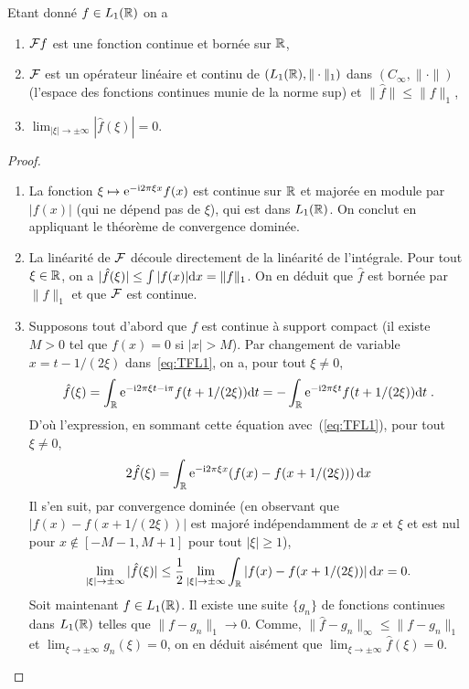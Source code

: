 \begin{theorem}
\label{thm:rieman-lebesgue}
Etant donn{\'e} $f \in L_1(\mathbb{R})$ on a
\begin{enumerate}
\item $\mathcal{F} f$ est une fonction continue et born{\'e}e sur $\mathbb{R}$,
\item $\mathcal{F}$ est un op{\'e}rateur lin{\'e}aire et continu de $(L_1(\mathbb{R}),\|\cdot\|_1)$ dans $(C_\infty,\|\cdot\|)$ (l'espace des
  fonctions continues munie de la norme sup) et $\| \hat{f} \| \leq \| f \|_1$,
\item $\lim_{|\xi| \to \pm \infty} |\hat{f}(\xi) |= 0 $.
\end{enumerate}
\end{theorem}
\begin{proof}
\begin{enumerate}
\item La fonction $\xi \mapsto \mathrm{e}^{- \mathrm{i} 2 \pi \xi x} f(x)$ est continue sur $\mathbb{R}$
  et major{\'e}e en module par $|f(x)|$ (qui ne d{\'e}pend pas de $\xi$), qui est dans $L_1(\mathbb{R})$. On conclut en appliquant le th\'eor\`eme de convergence domin\'ee.
\item La lin{\'e}arit{\'e} de $\mathcal{F}$ d{\'e}coule directement de la lin\'earit\'e de l'int{\'e}grale. Pour tout $\xi \in \mathbb{R}$, on a $|\hat{f}(\xi)| \leq
  \int |f(x)| \mathrm{d} x = \| f \|_1$. On en d{\'e}duit que $\hat{f}$ est born{\'e}e par $\| f\|_1$ et que $\mathcal{F}$ est continue.
\item Supposons tout d'abord que $f$ est continue {\`a} support compact (il existe $M>0$ tel que $f(x)=0$ si $|x|>M$). Par
  changement de variable $x=t-1/(2\xi)$ dans~\eqref{eq:TFL1}, on a, pour tout $\xi\neq0$,
$$
\hat{f}(\xi) = \int_{\mathbb{R}} \mathrm{e}^{- \mathrm{i} 2 \pi \xi t - \mathrm{i} \pi} f(t+1/(2\xi)) \mathrm{d} t =
- \int_{\mathbb{R}} \mathrm{e}^{- \mathrm{i} 2 \pi \xi t} f(t+1/(2\xi)) \mathrm{d} t \;.
$$
D'o{\`u} l'expression, en sommant cette {\'e}quation avec~(\ref{eq:TFL1}),  pour tout $\xi\neq0$,
$$
2 \hat{f}(\xi) = \int_{\mathbb{R}} \mathrm{e}^{- \mathrm{i} 2 \pi \xi x} (f(x)-f(x+1/(2\xi))) \,\mathrm{d} x
$$
Il s'en suit, par convergence domin{\'e}e (en observant que $|f(x)-f(x+1/(2\xi))|$ est major{\'e} ind{\'e}pendamment de $x$ et $\xi$ et
est nul pour $x\notin[-M-1,M+1]$ pour tout $|\xi|\geq1$),
$$
\lim_{|\xi| \to \pm \infty} |\hat{f}(\xi)| \leq \frac12 \lim_{|\xi| \to \pm \infty}
\int_{\mathbb{R}} |f(x)-f(x+1/(2\xi))| \,\mathrm{d} x = 0.
$$
Soit maintenant $f \in L_1(\mathbb{R})$. Il existe une suite $\{g_n\}$ de fonctions continues dans $L_1(\mathbb{R})$ telles que $\|f - g_n \|_1 \to 0$. Comme,
$\|\hat{f} - g_n\|_\infty \leq \| f - g_n \|_1$ et $\lim_{\xi \to \pm \infty} g_n(\xi) = 0$,
on en d{\'e}duit ais{\'e}ment que $\lim_{\xi  \to \pm \infty} \hat{f}(\xi)= 0$.
\end{enumerate}
\end{proof}

